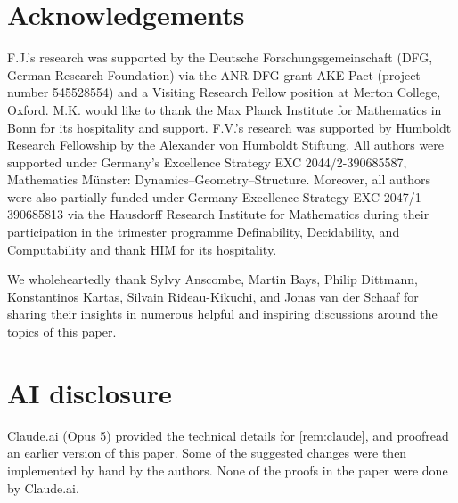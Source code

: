 \documentclass[a4paper]{amsart}
\theoremstyle{mystyle2}
\theoremstyle{mystyle}
\numberwithin{equation}{section}
\begin{document}
    \section*{Acknowledgements}
 F.J.'s research was 
supported by the Deutsche Forschungsgemeinschaft (DFG, German Research Foundation)
via the ANR-DFG grant AKE Pact (project number 545528554) and a Visiting Research Fellow position at Merton College, Oxford. 
M.K. would like to thank the Max Planck Institute for Mathematics in Bonn for its hospitality and support.
F.V.'s research was supported by 
Humboldt Research Fellowship by the Alexander von Humboldt Stiftung.
All authors were supported under Germany's Excellence Strategy EXC 2044/2-390685587, Mathematics M\"unster: Dynamics--Geometry--Structure. Moreover, all 
authors were also partially funded under Germany Excellence Strategy-EXC-2047/1-390685813 via the Hausdorff Research Institute for Mathematics during their participation in the trimester programme Definability, Decidability, and Computability and thank HIM for its hospitality.

We wholeheartedly thank Sylvy Anscombe, Martin Bays, Philip Dittmann, Konstantinos Kartas, Silvain Rideau-Kikuchi, and Jonas van der Schaaf for sharing their insights in numerous helpful and
inspiring discussions around the topics of this paper.


    \section*{AI disclosure}
    Claude.ai (Opus 5) provided the technical details for \cref{rem:claude}, and 
    proofread an earlier version of this paper. Some of the 
    suggested changes were then implemented by hand by the authors. None of the
    proofs in the paper were done by Claude.ai.
\end{document}
